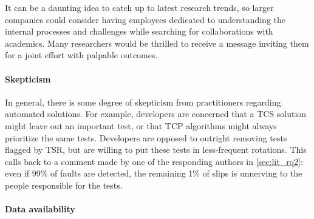 It can be a daunting idea to catch up to latest research trends, so larger companies could consider having employees dedicated to understanding the internal processes and challenges while searching for collaborations with academics.
Many researchers would be thrilled to receive a message inviting them for a joint effort with palpable outcomes.

\paragraph{Skepticism}
In general, there is some degree of skepticism from practitioners regarding automated solutions.
For example, developers are concerned that a TCS solution might leave out an important test, or that TCP algorithms might always prioritize the same tests.
Developers are opposed to outright removing tests flagged by TSR, but are willing to put these tests in less-frequent rotations.
This calls back to a comment made by one of the responding authors in \autoref{sec:lit_rq2}: even if 99\% of faults are detected, the remaining 1\% of slips is unnerving to the people responsible for the tests.

\paragraph{Data availability}
